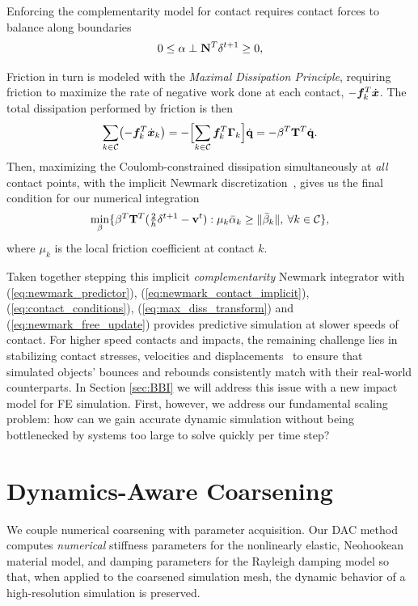 Enforcing the complementarity model for contact requires contact forces to balance along boundaries 
\begin{align}
\begin{split}
0 \leq \alpha \perp \mathbf {N}^T \delta^{t+1} \geq 0,
\label{eq:contact_conditions}
\end{split}
\end{align}

Friction in turn is modeled with the {\em Maximal Dissipation Principle}, requiring friction to maximize the rate of negative work done at each contact, $- \bm{f}_k^T \dot{\bm{x}}$. The total dissipation performed by friction is then 
\begin{align}
\sum_{k \in \mathcal{C}} \bigl(- \bm{f}_k^T \dot{\bm{x}}_k \bigr) =  -\Bigl[\sum_{k \in \mathcal{C}} \bm{f}_k^T  \mathbf {\Gamma}_k \Bigr] \dot{\mathbf {q}} =  - \beta^T \mathbf {T}^T \dot{\mathbf {q}}.
\end{align}
Then, maximizing the Coulomb-constrained dissipation simultaneously at \emph{all} contact points, with the implicit Newmark discretization~\cite{Pandolfi:2002ik}, gives us the final condition for our numerical integration
\begin{align}
\begin{split}
\min_{\beta} \{ \beta^T \mathbf {T}^T (\tfrac{2}{h} \delta^{t+1} - \mathbf {v}^t) : \mu_k \bar{\alpha}_k \geq \|\bar{\beta}_k\|, \> \forall k \in \mathcal{C} \},
\label{eq:max_diss_transform}
\end{split}
\end{align}
where $\mu_k$ is the local friction coefficient at contact $k$.

Taken together stepping this implicit \emph{complementarity} Newmark integrator with (\ref{eq:newmark_predictor}), (\ref{eq:newmark_contact_implicit}), (\ref{eq:contact_conditions}), (\ref{eq:max_diss_transform}) and (\ref{eq:newmark_free_update}) provides predictive simulation at slower speeds of contact. For higher speed contacts and impacts, the remaining challenge lies in stabilizing contact stresses, velocities and displacements~\cite{Deuflhard:2008fu} to ensure that simulated objects' bounces and rebounds consistently match with their real-world counterparts. 
In Section \ref{sec:BBI} we will address this issue with a new impact model for FE simulation. First, however, we address our fundamental scaling problem: how can we gain 
accurate dynamic simulation without being bottlenecked by systems too large to solve quickly per time step?
\section{Dynamics-Aware Coarsening}
\label{sec:DAC}
We couple numerical coarsening with parameter acquisition.
Our DAC method computes \emph{numerical} stiffness parameters for the nonlinearly elastic, Neohookean material model, and damping parameters for the Rayleigh damping model so that, when applied to the coarsened simulation mesh, the dynamic behavior of a high-resolution simulation is preserved.

